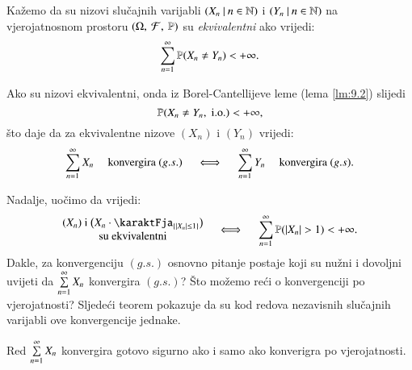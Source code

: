 \begin{defn}    \label{defn:13.6}
    Ka\v zemo da su nizovi slu\v cajnih varijabli $({X_n} \: | \: {n \in \mathbb{N}})$ i $({Y_n} \: | \: {n \in \mathbb{N}})$ na vjerojatnosnom prostoru $(\Omega, \: \mathcal{F}, \: \mathbb{P})$ su \emph{ekvivalentni} ako vrijedi:
    \begin{equation*}
        \sum\limits_{n = 1}^{\infty} \mathbb{P}({X_n \neq Y_n}) < +\infty.
    \end{equation*}
\end{defn}

Ako su nizovi ekvivalentni, onda iz Borel-Cantellijeve leme (lema \ref{lm:9.2}) slijedi
\begin{equation*}
    \mathbb{P}({X_n \neq Y_n, \; \mathrm{i.o.}}) < +\infty,
\end{equation*}
\v sto daje da za ekvivalentne nizove $(X_n)$ i $(Y_n)$ vrijedi:
\begin{equation}    \label{jed:13.7}
    \sum\limits_{n = 1}^{\infty} X_n \quad \textnormal{ konvergira } (g.s.) \quad \iff \quad \sum\limits_{n = 1}^{\infty} Y_n \quad \textnormal{ konvergira } (g.s).
\end{equation}

Nadalje, uo\v cimo da vrijedi:
\begin{equation}    \label{jed:13.8}
    \begin{matrix}
        (X_n) \textnormal{ i } \big(X_n \cdot \karaktFja_{\{ |X_n| \leq 1 \}}\big)\\
        \textnormal{su ekvivalentni}
    \end{matrix}
    \quad \iff \quad
    \suma{n = 1}{\infty} \vjeroj{|X_n|>1} < +\infty.
\end{equation}
Dakle, za konvergenciju $(g.s.)$ osnovno pitanje postaje koji su nu\v zni i dovoljni uvijeti da $\sum\limits_{n = 1}^{\infty} X_n$ konvergira $(g.s.)$?
\v Sto mo\v zemo re\' ci o konvergenciji po vjerojatnosti?
Sljede\' ci teorem pokazuje da su kod redova nezavisnih slu\v cajnih varijabli ove konvergencije jednake.

\begin{tm}[P. L\' evy]  \label{tm:13.9}
    Red $\sum\limits_{n = 1}^{\infty} X_n$ konvergira gotovo sigurno ako i samo ako konverigra po vjerojatnosti.
\end{tm}

